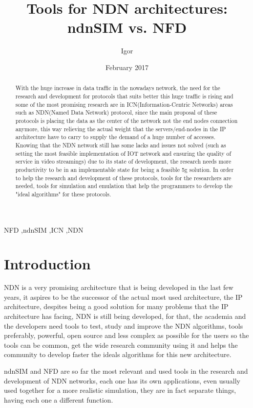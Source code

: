 \documentclass[preprint,10pt]{elsarticle}
\begin{document}
\begin{frontmatter}

\title{Tools for NDN architectures: ndnSIM vs. NFD}
\author{Igor}
\date{February 2017}
\address{Belem, Brazil}
\begin{abstract}
With the huge increase in data traffic in the nowadays network, the need for the research and development for protocols that suits better this huge traffic is rising and some of the most promising research are in ICN(Information-Centric Networks) areas such as NDN(Named Data Network) protocol, since the main proposal of these protocols is placing the data as the center of the network not the end nodes connection anymore, this way relieving the actual weight that the servers/end-nodes in the IP architecture have to carry to supply the demand of a huge number of accesses. Knowing that the NDN network still has some lacks and issues not solved (such as setting the most feasible implementation of IOT network and ensuring the quality of service in video streamings) due to its state of development, the research needs more productivity to be in an implementable state for being a feasible 5g solution. In order to help the research and development of these protocols, tools for the researchers are needed, tools for simulation and emulation that help the programmers to develop the "ideal algorithms" for these protocols.

\end{abstract}

\begin{keyword}
NFD \sep ndnSIM \sep ICN \sep NDN 


\end{keyword}
\end{frontmatter}
\section{Introduction}
\label{S:1}
   NDN is a very promising architecture that is being developed in the last few years, it aspires to be the successor of the actual most used architecture, the IP architecture, despites being a good solution for many problems that the IP architecture has facing, NDN is still being developed, for that, the academia and the developers need tools to test, study and improve the NDN algorithms, tools preferably, powerful, open source and less complex as possible for the users so the tools can be common, get the wide research community using it and helps the community to develop faster the ideals algorithms for this new architecture. \par
    ndnSIM and NFD are so far the most relevant and used tools in the research and development of NDN networks, each one has its own applications, even usually used together for a more realistic simulation, they are in fact separate things, having each one a different function.
\end{document}
